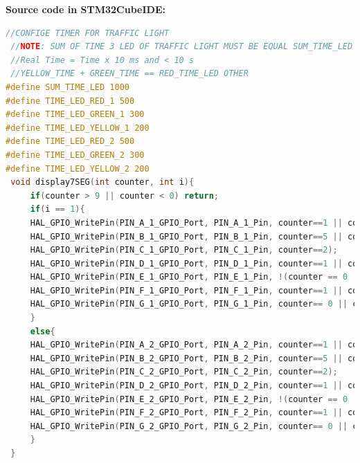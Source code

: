\documentclass[twoside, final]{hcmut_report}
\begin{document}
\textbf{Source code in STM32CubeIDE:}
\begin{lstlisting}[language=C, caption=Source code for Exercise 5]
 //CONFIGE TIMER FOR TRAFFIC LIGHT
 //NOTE: SUM OF TIME 3 LED OF TRAFFIC LIGHT MUST BE EQUAL SUM_TIME_LED
 //Real Time = Time x 10 ms and < 10 s
 //YELLOW_TIME + GREEN_TIME == RED_TIME_LED OTHER
#define SUM_TIME_LED 1000
#define TIME_LED_RED_1 500
#define TIME_LED_GREEN_1 300
#define TIME_LED_YELLOW_1 200
#define TIME_LED_RED_2 500
#define TIME_LED_GREEN_2 300
#define TIME_LED_YELLOW_2 200
 void display7SEG(int counter, int i){
	 if(counter > 9 || counter < 0) return;
	 if(i == 1){
	 HAL_GPIO_WritePin(PIN_A_1_GPIO_Port, PIN_A_1_Pin, counter==1 || counter==4);
	 HAL_GPIO_WritePin(PIN_B_1_GPIO_Port, PIN_B_1_Pin, counter==5 || counter==6);
	 HAL_GPIO_WritePin(PIN_C_1_GPIO_Port, PIN_C_1_Pin, counter==2);
	 HAL_GPIO_WritePin(PIN_D_1_GPIO_Port, PIN_D_1_Pin, counter==1 || counter==4 || counter==7);
	 HAL_GPIO_WritePin(PIN_E_1_GPIO_Port, PIN_E_1_Pin, !(counter == 0 || counter == 2 || counter == 6 || counter == 8));
	 HAL_GPIO_WritePin(PIN_F_1_GPIO_Port, PIN_F_1_Pin, counter==1 || counter==2 || counter==3 || counter==7);
	 HAL_GPIO_WritePin(PIN_G_1_GPIO_Port, PIN_G_1_Pin, counter== 0 || counter==1 || counter==7);
	 }
	 else{
	 HAL_GPIO_WritePin(PIN_A_2_GPIO_Port, PIN_A_2_Pin, counter==1 || counter==4);
	 HAL_GPIO_WritePin(PIN_B_2_GPIO_Port, PIN_B_2_Pin, counter==5 || counter==6);
	 HAL_GPIO_WritePin(PIN_C_2_GPIO_Port, PIN_C_2_Pin, counter==2);
	 HAL_GPIO_WritePin(PIN_D_2_GPIO_Port, PIN_D_2_Pin, counter==1 || counter==4 || counter==7);
	 HAL_GPIO_WritePin(PIN_E_2_GPIO_Port, PIN_E_2_Pin, !(counter == 0 || counter == 2 || counter == 6 || counter == 8));
	 HAL_GPIO_WritePin(PIN_F_2_GPIO_Port, PIN_F_2_Pin, counter==1 || counter==2 || counter==3 || counter==7);
	 HAL_GPIO_WritePin(PIN_G_2_GPIO_Port, PIN_G_2_Pin, counter== 0 || counter==1 || counter==7);
	 }
 }
\end{lstlisting}
\end{document}
